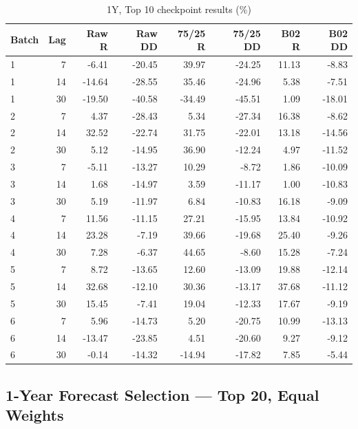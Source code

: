 \documentclass[11pt,a4paper]{article}
\numberwithin{table}{section}
\begin{document}
\begin{minipage}{\linewidth}
\begin{center}\footnotesize\setlength{\tabcolsep}{3pt}\renewcommand{\arraystretch}{1.12}
\begin{longtable}{@{}lrrrrrrr@{}}
\caption{1Y, Top 10 checkpoint results (\%)}\\
\toprule
Batch & Lag & Raw R & Raw DD & 75/25 R & 75/25 DD & B02 R & B02 DD\\\midrule\endhead
1 & 7 & -6.41 & -20.45 & 39.97 & -24.25 & 11.13 & -8.83\\
1 & 14 & -14.64 & -28.55 & 35.46 & -24.96 & 5.38 & -7.51\\
1 & 30 & -19.50 & -40.58 & -34.49 & -45.51 & 1.09 & -18.01\\
2 & 7 & 4.37 & -28.43 & 5.34 & -27.34 & 16.38 & -8.62\\
2 & 14 & 32.52 & -22.74 & 31.75 & -22.01 & 13.18 & -14.56\\
2 & 30 & 5.12 & -14.95 & 36.90 & -12.24 & 4.97 & -11.52\\
3 & 7 & -5.11 & -13.27 & 10.29 & -8.72 & 1.86 & -10.09\\
3 & 14 & 1.68 & -14.97 & 3.59 & -11.17 & 1.00 & -10.83\\
3 & 30 & 5.19 & -11.97 & 6.84 & -10.83 & 16.18 & -9.09\\
4 & 7 & 11.56 & -11.15 & 27.21 & -15.95 & 13.84 & -10.92\\
4 & 14 & 23.28 & -7.19 & 39.66 & -19.68 & 25.40 & -9.26\\
4 & 30 & 7.28 & -6.37 & 44.65 & -8.60 & 15.28 & -7.24\\
5 & 7 & 8.72 & -13.65 & 12.60 & -13.09 & 19.88 & -12.14\\
5 & 14 & 32.68 & -12.10 & 30.36 & -13.17 & 37.68 & -11.12\\
5 & 30 & 15.45 & -7.41 & 19.04 & -12.33 & 17.67 & -9.19\\
6 & 7 & 5.96 & -14.73 & 5.20 & -20.75 & 10.99 & -13.13\\
6 & 14 & -13.47 & -23.85 & 4.51 & -20.60 & 9.27 & -9.12\\
6 & 30 & -0.14 & -14.32 & -14.94 & -17.82 & 7.85 & -5.44\\
\bottomrule\end{longtable}\end{center}
\end{minipage}\par
{}
\subsection{1-Year Forecast Selection --- Top 20, Equal Weights}
\end{document}
